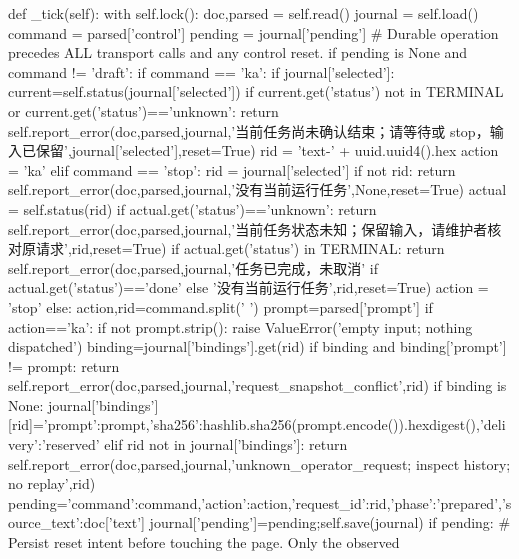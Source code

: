     def _tick(self):
        with self.lock():
            doc,parsed = self.read()
            journal = self.load()
            command = parsed['control']
            pending = journal['pending']
            # Durable operation precedes ALL transport calls and any control reset.
            if pending is None and command != 'draft':
                if command == 'ka':
                    if journal['selected']:
                        current=self.status(journal['selected'])
                        if current.get('status') not in TERMINAL or current.get('status')=='unknown':
                            return self.report_error(doc,parsed,journal,'当前任务尚未确认结束；请等待或 stop，输入已保留',journal['selected'],reset=True)
                    rid = 'text-' + uuid.uuid4().hex
                    action = 'ka'
                elif command == 'stop':
                    rid = journal['selected']
                    if not rid:
                        return self.report_error(doc,parsed,journal,'没有当前运行任务',None,reset=True)
                    actual = self.status(rid)
                    if actual.get('status')=='unknown':
                        return self.report_error(doc,parsed,journal,'当前任务状态未知；保留输入，请维护者核对原请求',rid,reset=True)
                    if actual.get('status') in TERMINAL:
                        return self.report_error(doc,parsed,journal,'任务已完成，未取消' if actual.get('status')=='done' else '没有当前运行任务',rid,reset=True)
                    action = 'stop'
                else:
                    action,rid=command.split(' ')
                prompt=parsed['prompt']
                if action=='ka':
                    if not prompt.strip(): raise ValueError('empty input; nothing dispatched')
                    binding=journal['bindings'].get(rid)
                    if binding and binding['prompt'] != prompt:
                        return self.report_error(doc,parsed,journal,'request_snapshot_conflict',rid)
                    if binding is None:
                        journal['bindings'][rid]={'prompt':prompt,'sha256':hashlib.sha256(prompt.encode()).hexdigest(),'delivery':'reserved'}
                elif rid not in journal['bindings']:
                    return self.report_error(doc,parsed,journal,'unknown_operator_request; inspect history; no replay',rid)
                pending={'command':command,'action':action,'request_id':rid,'phase':'prepared','source_text':doc['text']}
                journal['pending']=pending;self.save(journal)
            if pending:
                # Persist reset intent before touching the page. Only the observed
